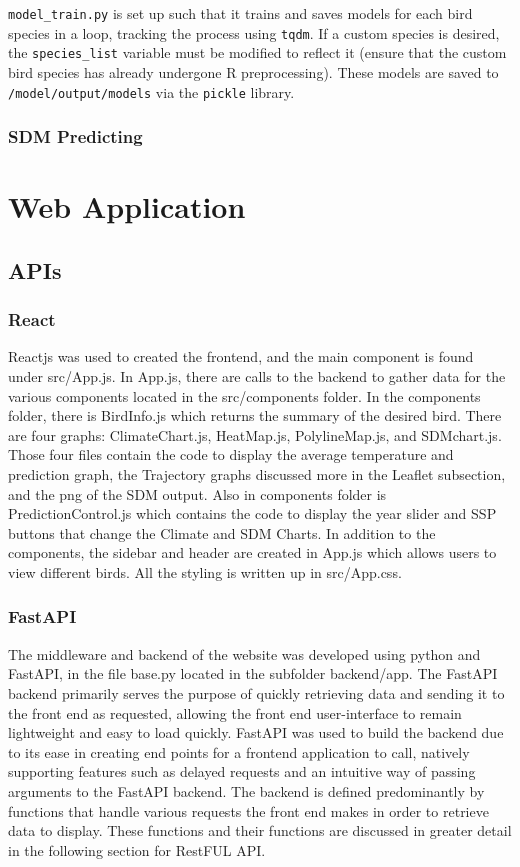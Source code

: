 \documentclass{article}
\begin{document}
\noindent \texttt{model\_train.py} is set up such that it trains and saves models for each bird species in a loop, tracking the process using \texttt{tqdm}. If a custom species is desired, the \texttt{species\_list} variable must be modified to reflect it (ensure that the custom bird species has already undergone R preprocessing). These models are saved to \texttt{/model/output/models} via the \texttt{pickle} library.

\subsubsection{SDM Predicting}

\newpage

\section{Web Application}

\subsection{APIs}

\subsubsection*{React}
Reactjs was used to created the frontend, and the main component is found under src/App.js. In App.js, there are calls to the backend to gather data for the various components
located in the src/components folder. In the components folder, there is BirdInfo.js which returns the summary of the desired bird. There are four graphs: ClimateChart.js,
HeatMap.js, PolylineMap.js, and SDMchart.js. Those four files contain the code to display the average temperature and prediction graph, the Trajectory graphs discussed more 
in the Leaflet subsection, and the png of the SDM output. Also in components folder is PredictionControl.js which contains the code to display the year slider and SSP buttons that 
change the Climate and SDM Charts. In addition to the components, the sidebar and header are created in App.js which allows users to view different birds. All the styling is written 
up in src/App.css. 

\subsubsection*{FastAPI}
The middleware and backend of the website was developed using python and FastAPI, in the file base.py located in the subfolder backend/app. The FastAPI backend primarily serves the purpose of quickly retrieving data and sending it to the front end as requested, allowing the front end user-interface to remain lightweight and easy to load quickly. FastAPI was used to build the backend due to its ease in creating end points for a frontend application to call, natively supporting features such as delayed requests and an intuitive way of passing arguments to the FastAPI backend.
The backend is defined predominantly by functions that handle various requests the front end makes in order to retrieve data to display. These functions and their functions are discussed in greater detail in the following section for RestFUL API.
\end{document}
